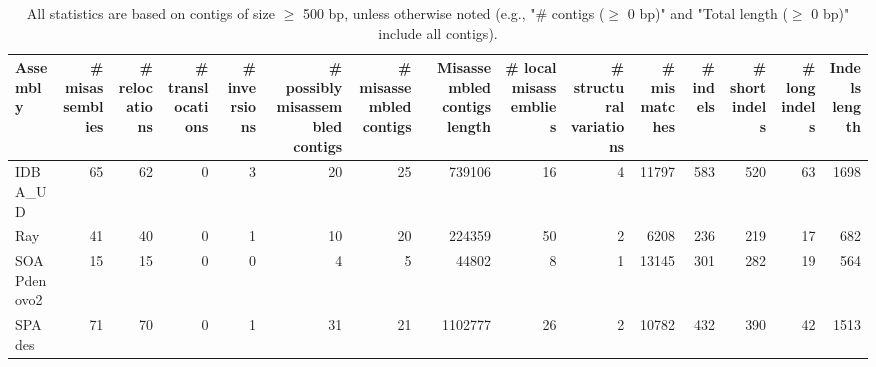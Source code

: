 \documentclass[12pt,a4paper]{article}
\begin{document}
\begin{table}[ht]
\begin{center}
\caption{All statistics are based on contigs of size $\geq$ 500 bp, unless otherwise noted (e.g., "\# contigs ($\geq$ 0 bp)" and "Total length ($\geq$ 0 bp)" include all contigs).}
\begin{tabular}{|l*{14}{|r}|}
\hline
Assembly & \# misassemblies &     \# relocations &     \# translocations &     \# inversions & \# possibly misassembled contigs & \# misassembled contigs & Misassembled contigs length & \# local misassemblies & \# structural variations & \# mismatches & \# indels &     \# short indels &     \# long indels & Indels length \\ \hline
IDBA\_UD & 65 & 62 & 0 & 3 & 20 & 25 & 739106 & 16 & 4 & 11797 & 583 & 520 & 63 & 1698 \\ \hline
Ray & 41 & 40 & 0 & 1 & 10 & 20 & 224359 & 50 & 2 & 6208 & 236 & 219 & 17 & 682 \\ \hline
SOAPdenovo2 & 15 & 15 & 0 & 0 & 4 & 5 & 44802 & 8 & 1 & 13145 & 301 & 282 & 19 & 564 \\ \hline
SPAdes & 71 & 70 & 0 & 1 & 31 & 21 & 1102777 & 26 & 2 & 10782 & 432 & 390 & 42 & 1513 \\ \hline
\end{tabular}
\end{center}
\end{table}
\end{document}
